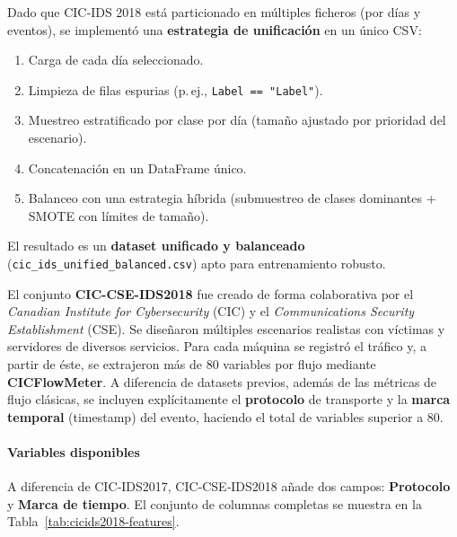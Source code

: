 Dado que CIC‑IDS 2018 está particionado en múltiples ficheros (por días y eventos), se implementó una \textbf{estrategia de unificación} en un único CSV:

\begin{enumerate}
  \item Carga de cada día seleccionado.
  \item Limpieza de filas espurias (p.\,ej., \texttt{Label == "Label"}).
  \item Muestreo estratificado por clase por día (tamaño ajustado por prioridad del escenario).
  \item Concatenación en un DataFrame único.
  \item Balanceo con una estrategia híbrida (submuestreo de clases dominantes + SMOTE con límites de tamaño).
\end{enumerate}

El resultado es un \textbf{dataset unificado y balanceado} (\texttt{cic\_ids\_unified\_balanced.csv}) apto para entrenamiento robusto.

El conjunto \textbf{CIC-CSE-IDS2018} fue creado de forma colaborativa por el \emph{Canadian Institute for Cybersecurity} (CIC) y el \emph{Communications Security Establishment} (CSE). Se diseñaron múltiples escenarios realistas con víctimas y servidores de diversos servicios. Para cada máquina se registró el tráfico y, a partir de éste, se extrajeron más de 80 variables por flujo mediante \textbf{CICFlowMeter}. A diferencia de datasets previos, además de las métricas de flujo clásicas, se incluyen explícitamente el \textbf{protocolo} de transporte y la \textbf{marca temporal} (timestamp) del evento, haciendo el total de variables superior a 80.

\paragraph{Variables disponibles}
A diferencia de CIC‑IDS2017, CIC‑CSE‑IDS2018 añade dos campos: \textbf{Protocolo} y \textbf{Marca de tiempo}. El conjunto de columnas completas se muestra en la Tabla~\ref{tab:cicids2018-features}.


